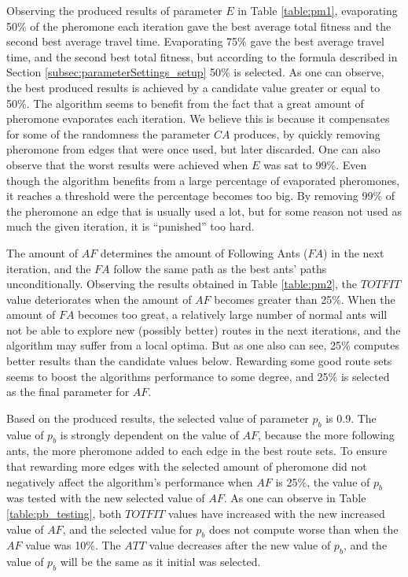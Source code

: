 Observing the produced results of parameter $E$ in Table \vref{table:pm1}, evaporating 50\% of the pheromone each iteration gave the best average total fitness and the second best average travel time. Evaporating 75\% gave the best average travel time, and the second best total fitness, but according to the formula described in Section \vref{subsec:parameterSettings_setup} 50\% is selected. As one can observe, the best produced results is achieved by a candidate value greater or equal to 50\%. The algorithm seems to benefit from the fact that a great amount of pheromone evaporates each iteration. We believe this is because it compensates for some of the randomness the parameter $CA$ produces, by quickly removing pheromone from edges that were once used, but later discarded. One can also observe that the worst results were achieved when $E$ was sat to 99\%. Even though the algorithm benefits from a large percentage of evaporated pheromones, it reaches a threshold were the percentage becomes too big. By removing 99\% of the pheromone an edge that is usually used a lot, but for some reason not used as much the given iteration, it is ``punished'' too hard. 
\newline

The amount of $AF$ determines the amount of Following Ants ($FA$) in the next iteration, and the $FA$ follow the same path as the best ants' paths unconditionally. Observing the results obtained in Table \vref{table:pm2}, the $TOTFIT$ value deteriorates when the amount of $AF$ becomes greater than 25\%. When the amount of $FA$ becomes too great, a relatively large number of normal ants will not be able to explore new (possibly better) routes in the next iterations, and the algorithm may suffer from a local optima. But as one also can see, 25\% computes better results than the candidate values below. Rewarding some good route sets seems to boost the algorithms performance to some degree, and 25\% is selected as the final parameter for $AF$.

Based on the produced results, the selected value of parameter $p_b$ is 0.9. The value of $p_b$ is strongly dependent on the value of $AF$, because the more following ants, the more pheromone added to each edge in the best route sets. To ensure that rewarding more edges with the selected amount of pheromone did not negatively affect the algorithm's performance when $AF$ is 25\%, the value of $p_b$ was tested with the new selected value of $AF$. As one can observe in Table \vref{table:pb_testing}, both $TOTFIT$ values have increased with the new increased value of $AF$, and the selected value for $p_b$ does not compute worse than when the $AF$ value was 10\%. The $ATT$ value decreases after the new value of $p_b$, and the value of $p_b$ will be the same as it initial was selected. 

